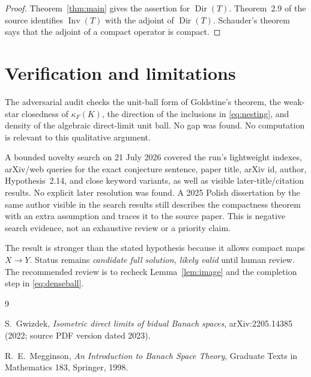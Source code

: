 \documentclass[11pt]{article}
\newcommand{\Dir}{\operatorname{Dir}}
\newcommand{\Inv}{\operatorname{Inv}}
\begin{document}
\begin{proof}
Theorem~\ref{thm:main} gives the assertion for \(\Dir(T)\). Theorem~2.9 of
the source identifies \(\Inv(T)\) with the adjoint of \(\Dir(T)\). Schauder's
theorem \cite[Chapter~3]{megginson} says that the adjoint of a compact
operator is compact.
\end{proof}

\section{Verification and limitations}

The adversarial audit checks the unit-ball form of Goldstine's theorem, the
weak-star closedness of \(\kappa_F(K)\), the direction of the inclusions in
\eqref{eq:nesting}, and density of the algebraic direct-limit unit ball. No
gap was found. No computation is relevant to this qualitative argument.

A bounded novelty search on 21 July 2026 covered the run's lightweight
indexes, arXiv/web queries for the exact conjecture sentence, paper title,
arXiv id, author, Hypothesis~2.14, and close keyword variants, as well as
visible later-title/citation results. No explicit later resolution was found.
A 2025 Polish dissertation by the same author visible in the search results
still describes the compactness theorem with an extra assumption and traces it
to the source paper. This is negative search evidence, not an exhaustive
review or a priority claim.

The result is stronger than the stated hypothesis because it allows compact
maps \(X\to Y\). Status remains \emph{candidate full solution, likely valid}
until human review. The recommended review is to recheck
Lemma~\ref{lem:image} and the completion step in
\eqref{eq:denseball}.

\begin{thebibliography}{9}

S.~Gwizdek,
\emph{Isometric direct limits of bidual Banach spaces},
arXiv:2205.14385 (2022; source PDF version dated 2023).

R.~E.~Megginson,
\emph{An Introduction to Banach Space Theory},
Graduate Texts in Mathematics 183, Springer, 1998.

\end{thebibliography}
\end{document}
